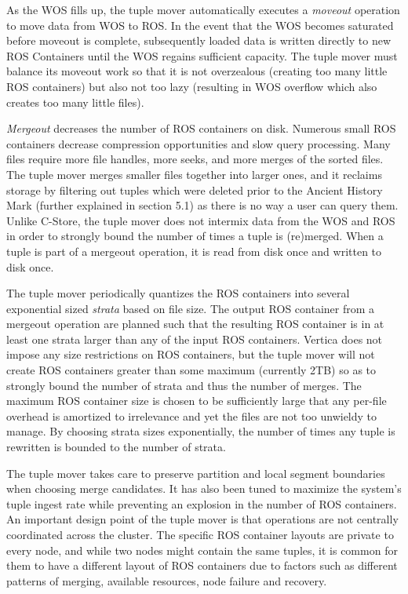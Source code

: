 \documentclass[a4paper,12pt,notitlepage,twoside,openright]{article}
\begin{document}
As the WOS fills up, the tuple mover automatically executes a
\emph{moveout} operation to move data from WOS to ROS. In the event that
the WOS becomes saturated before moveout is complete, subsequently
loaded data is written directly to new ROS Containers until the WOS
regains sufficient capacity. The tuple mover must balance its moveout
work so that it is not overzealous (creating too many little ROS
containers) but also not too lazy (resulting in WOS overflow which also
creates too many little files).

\emph{Mergeout} decreases the number of ROS containers on disk. Numerous
small ROS containers decrease compression opportunities and slow query
processing. Many files require more file handles, more seeks, and more
merges of the sorted files. The tuple mover merges smaller files
together into larger ones, and it reclaims storage by filtering out
tuples which were deleted prior to the Ancient History Mark (further
explained in section 5.1) as there is no way a user can query them.
Unlike C-Store, the tuple mover does not intermix data from the WOS and
ROS in order to strongly bound the number of times a tuple is
(re)merged. When a tuple is part of a mergeout operation, it is read
from disk once and written to disk once.

The tuple mover periodically quantizes the ROS containers into several
exponential sized \emph{strata} based on file size. The output ROS
container from a mergeout operation are planned such that the resulting
ROS container is in at least one strata larger than any of the input ROS
containers. Vertica does not impose any size restrictions on ROS
containers, but the tuple mover will not create ROS containers greater
than some maximum (currently 2TB) so as to strongly bound the number of
strata and thus the number of merges. The maximum ROS container size is
chosen to be sufficiently large that any per-file overhead is amortized
to irrelevance and yet the files are not too unwieldy to manage. By
choosing strata sizes exponentially, the number of times any tuple is
rewritten is bounded to the number of strata.

The tuple mover takes care to preserve partition and local segment
boundaries when choosing merge candidates. It has also been tuned to
maximize the system's tuple ingest rate while preventing an explosion in
the number of ROS containers. An important design point of the tuple
mover is that operations are not centrally coordinated across the
cluster. The specific ROS container layouts are private to every node,
and while two nodes might contain the same tuples, it is common for them
to have a different layout of ROS containers due to factors such as
different patterns of merging, available resources, node failure and
recovery.
\end{document}
